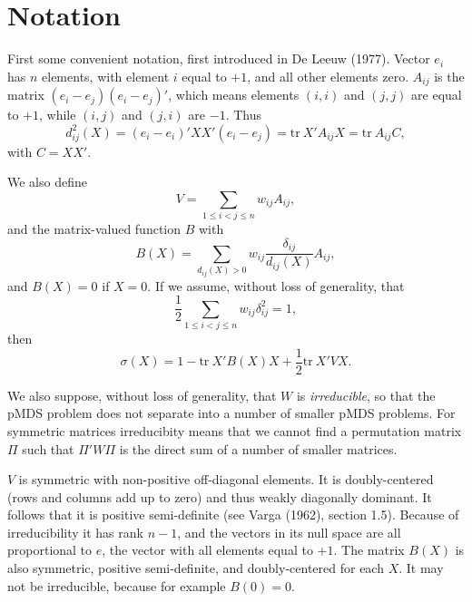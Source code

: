 \documentclass[
  12pt,
]{article}
\begin{document}
\section{Notation}\label{notation}

First some convenient notation, first introduced in De Leeuw (1977). Vector \(e_i\) has \(n\) elements, with element \(i\) equal to \(+1\), and all other elements zero. \(A_{ij}\) is the matrix \((e_i-e_j)(e_i-e_j)'\), which means elements \((i,i)\) and \((j,j)\) are equal to \(+1\), while \((i,j)\) and \((j,i)\) are \(-1\). Thus
\begin{equation}
d_{ij}^2(X)=(e_i-e_i)'XX'(e_i-e_j)=\text{tr}\ X'A_{ij}X=\text{tr}\ A_{ij}C,
\label{eq:anot}
\end{equation}
with \(C=XX'\).

We also define
\begin{equation}
V=\mathop{\sum}_{1\leq i<j\leq n}w_{ij}A_{ij},
\label{eq:vdef}
\end{equation}
and the matrix-valued function \(B\) with
\begin{equation}
B(X)=\mathop{\sum}_{d_{ij}(X)>0}w_{ij}\frac{\delta_{ij}}{d_{ij}(X)}A_{ij},
\label{eq:bdef}
\end{equation}
and \(B(X)=0\) if \(X=0\). If we assume, without loss of generality, that
\begin{equation}
\frac12\mathop{\sum}_{1\leq i<j\leq n}w_{ij}\delta_{ij}^2=1,
\label{eq:dnorm}
\end{equation}
then
\begin{equation}
\sigma(X)=1-\text{tr}\ X'B(X)X+\frac12\text{tr}\ X'VX.
\label{eq:S}
\end{equation}

We also suppose, without loss of generality, that \(W\) is \emph{irreducible}, so that the pMDS problem does not separate into a number of smaller pMDS problems. For symmetric matrices irreducibity means that we cannot find a permutation matrix \(\Pi\) such that \(\Pi'W\Pi\) is the direct sum of a number of smaller matrices.

\(V\) is symmetric with non-positive off-diagonal elements. It is doubly-centered (rows and columns add up to zero) and thus weakly diagonally dominant. It follows that it is positive semi-definite (see Varga (1962), section 1.5). Because of irreducibility it has rank \(n-1\), and the vectors in its null space are all proportional to \(e\), the vector with all elements equal to \(+1\). The matrix \(B(X)\) is also symmetric, positive semi-definite, and doubly-centered for each \(X\). It may not be irreducible, because for example \(B(0)=0\).
\end{document}
